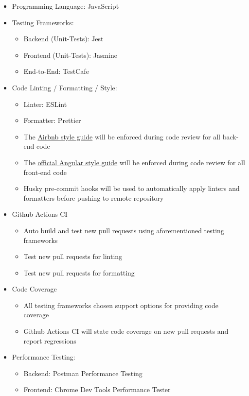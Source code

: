 \documentclass[12pt, titlepage]{article}
\begin{document}
\begin{itemize}
    \item Programming Language: JavaScript
    \item Testing Frameworks:
   \begin{itemize}
       \item Backend (Unit-Tests): Jest
       \item Frontend (Unit-Tests): Jasmine
       \item End-to-End: TestCafe
   \end{itemize}
   \item Code Linting / Formatting / Style:
   \begin{itemize}
       \item Linter: ESLint
       \item Formatter: Prettier
        \item The \href{https://github.com/airbnb/javascript}{Airbnb style guide} will be enforced during code review for all back-end code
        \item The \href{https://angular.io/guide/styleguide}{official Angular style guide} will be enforced during code review for all front-end code
       \item Husky pre-commit hooks will be used to automatically apply linters and formatters before pushing to remote repository
   \end{itemize}
\item Github Actions CI 
    \begin{itemize}
        \item Auto build and test new pull requests using aforementioned testing frameworks
        \item Test new pull requests for linting
        \item Test new pull requests for formatting
    \end{itemize}
\item Code Coverage
    \begin{itemize}
        \item All testing frameworks chosen support options for providing code coverage
        \item Github Actions CI will state code coverage on new pull requests and report regressions
        
    \end{itemize}

\item Performance Testing: 
    \begin{itemize}
       \item Backend: Postman Performance Testing
       \item Frontend: Chrome Dev Tools Performance Tester
   \end{itemize}
\end{itemize}
\end{document}
